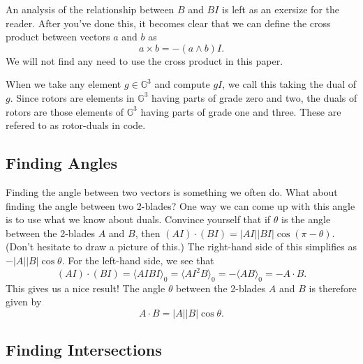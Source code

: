 \documentclass{article}
\newcommand{\G}{\mathbb{G}}
\begin{document}
An analysis of the relationship between $B$ and $BI$ is left
as an exersize for the reader.  After you've done this, it
becomes clear that we can define the cross product between
vectors $a$ and $b$ as
\begin{equation*}
a\times b = -(a\wedge b)I.
\end{equation*}
We will not find any need to use the cross product in this paper.

When we take any element $g\in\G^3$ and compute $gI$, we call
this taking the dual of $g$.  Since rotors are elements in $\G^3$
having parts of grade zero and two, the duals of rotors are those
elements of $\G^3$ having parts of grade one and three.  These
are refered to as rotor-duals in code.

\subsection{Finding Angles}

Finding the angle between two vectors is something we often do.
What about finding the angle between two 2-blades?  One way we
can come up with this angle is to use what we know about duals.
Convince yourself that if $\theta$ is the angle between
the 2-blades $A$ and $B$, then $(AI)\cdot(BI) = |AI||BI|\cos(\pi-\theta)$.
(Don't hesitate to draw a picture of this.)
The right-hand side of this simplifies as $-|A||B|\cos\theta$.
For the left-hand side, we see that
\begin{equation*}
(AI)\cdot(BI) = \langle AIBI\rangle_0
 = \langle AI^2B\rangle_0
 = -\langle AB\rangle_0
 = -A\cdot B.
\end{equation*}
This gives us a nice result!  The angle $\theta$ between the 2-blades
$A$ and $B$ is therefore given by
\begin{equation*}
A\cdot B = |A||B|\cos\theta.
\end{equation*}

\subsection{Finding Intersections}
\end{document}

